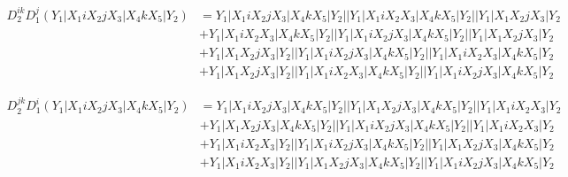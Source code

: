 \documentclass{article}[12pt]
\begin{document}
\begin{align*}
D_2^{ik}D_1^j(Y_1|X_1iX_2jX_3|X_4kX_5|Y_2)& =Y_1|X_1iX_2jX_3|X_4kX_5|Y_2||Y_1|X_1iX_2X_3|X_4kX_5|Y_2||Y_1|X_1X_2jX_3|Y_2\\ 
 & +Y_1|X_1iX_2X_3|X_4kX_5|Y_2||Y_1|X_1iX_2jX_3|X_4kX_5|Y_2||Y_1|X_1X_2jX_3|Y_2\\  
 & +Y_1|X_1X_2jX_3|Y_2||Y_1|X_1iX_2jX_3|X_4kX_5|Y_2||Y_1|X_1iX_2X_3|X_4kX_5|Y_2\\ 
 & +Y_1|X_1X_2jX_3|Y_2||Y_1|X_1iX_2X_3|X_4kX_5|Y_2||Y_1|X_1iX_2jX_3|X_4kX_5|Y_2\end{align*}

\begin{align*}
D_2^{jk}D_1^i(Y_1|X_1iX_2jX_3|X_4kX_5|Y_2)& =Y_1|X_1iX_2jX_3|X_4kX_5|Y_2||Y_1|X_1X_2jX_3|X_4kX_5|Y_2||Y_1|X_1iX_2X_3|Y_2\\ 
 & +Y_1|X_1X_2jX_3|X_4kX_5|Y_2||Y_1|X_1iX_2jX_3|X_4kX_5|Y_2||Y_1|X_1iX_2X_3|Y_2\\ 
 & +Y_1|X_1iX_2X_3|Y_2||Y_1|X_1iX_2jX_3|X_4kX_5|Y_2||Y_1|X_1X_2jX_3|X_4kX_5|Y_2\\ 
 & +Y_1|X_1iX_2X_3|Y_2||Y_1|X_1X_2jX_3|X_4kX_5|Y_2||Y_1|X_1iX_2jX_3|X_4kX_5|Y_2\end{align*}
\end{document}
